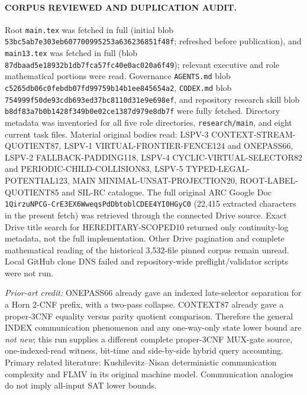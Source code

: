 \documentclass[11pt]{article}
\begin{document}
\paragraph{CORPUS REVIEWED AND DUPLICATION AUDIT.}
Root \texttt{main.tex} was fetched in full (initial blob \texttt{53bc5ab7e303eb607700995253a636236851f48f}; refreshed before publication), and \texttt{main13.tex} was fetched in full (blob \texttt{87dbaad5e18932b1db7fca57fc40e0ac020a6f49}); relevant executive and role mathematical portions were read. Governance \texttt{AGENTS.md} blob \texttt{c5265db06c0febdb07fd99759b14b1ee845654a2}, \texttt{CODEX.md} blob \texttt{754999f50de93cdb693ed37bc8110d31e9e698ef}, and repository research skill blob \texttt{b8df83a7b0b1428f349b0e02ce1387d979e8db7f} were fully fetched. Directory metadata was inventoried for all five role directories, \texttt{research/main}, and eight current task files. Material original bodies read: LSPV-3 CONTEXT-STREAM-QUOTIENT87, LSPV-1 VIRTUAL-FRONTIER-FENCE124 and ONEPASS66, LSPV-2 FALLBACK-PADDING118, LSPV-4 CYCLIC-VIRTUAL-SELECTOR82 and PERIODIC-CHILD-COLLISION83, LSPV-5 TYPED-LEGAL-POTENTIAL123, MAIN MINIMAL-UNSAT-PROJECTION20, ROOT-LABEL-QUOTIENT85 and SIL-RC catalogue. The full original ARC Google Doc \texttt{1QirzuNPCG-CrE3EX6WweqsPdDbtoblCDEE4YI0HGyC0} (22,415 extracted characters in the present fetch) was retrieved through the connected Drive source. Exact Drive title search for HEREDITARY-SCOPED10 returned only continuity-log metadata, not the full implementation. Other Drive pagination and complete mathematical reading of the historical 3,532-file pinned corpus remain unread. Local GitHub clone DNS failed and repository-wide preflight/validator scripts were not run.

\emph{Prior-art credit:} ONEPASS66 already gave an indexed late-selector separation for a Horn 2-CNF prefix, with a two-pass collapse. CONTEXT87 already gave a proper-3CNF equality versus parity quotient comparison. Therefore the general INDEX communication phenomenon and any one-way-only state lower bound are \emph{not new}; this run supplies a different complete proper-3CNF MUX-gate source, one-indexed-read witness, bit-time and side-by-side hybrid query accounting. Primary related literature: Kushilevitz--Nisan deterministic communication complexity and FLMV in its original machine model. Communication analogies do not imply all-input SAT lower bounds.
\end{document}
